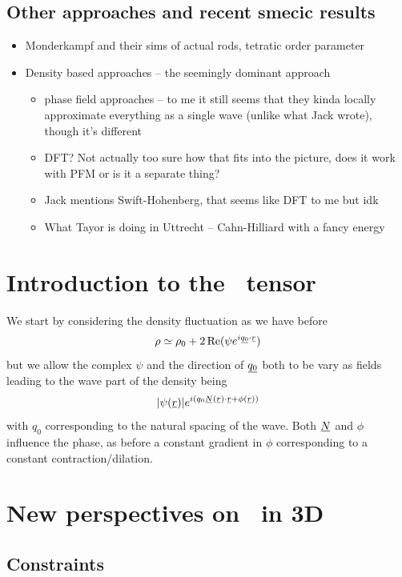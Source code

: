 \documentclass[12pt]{article}
\newcommand{\suf}[2]{\stackunder[1pt]{\ensuremath{#1}}{\rule{\widthof{\ensuremath{#2}}*\real{0.9}}{.1ex}}}
\newcommand{\duf}[2]{\stackunder[1pt]{\suf{\ensuremath{#1}}{#2}}{\rule{\widthof{\ensuremath{#2}}*\real{0.9}}{.1ex}}}
\newcommand{\su}[1]{\suf{#1}{#1}}
\newcommand{\du}[1]{\duf{#1}{#1}}
\newcommand{\ssu}[1]{\scriptsize\su{#1}\normalsize}
\newcommand{\EE}{\du{E}}
\begin{document}
\subsection{Other approaches and recent smecic results}
\begin{itemize}
    \item Monderkampf and their sims of actual rods, tetratic order parameter
    \item Density based approaches -- the seemingly dominant approach
    \begin{itemize}
        \item phase field approaches -- to me it still seems that they kinda locally approximate everything as a single wave (unlike what Jack wrote), though it's different
        \item DFT? Not actually too sure how that fits into the picture, does it work with PFM or is it a separate thing?
        \item Jack mentions Swift-Hohenberg, that seems like DFT to me but idk
        \item What Tayor is doing in Uttrecht -- Cahn-Hilliard with a fancy energy
    \end{itemize}
\end{itemize}

\section{Introduction to the \EE\ tensor}
We start by considering the density fluctuation as we have before
\begin{equation}
    \rho \simeq \rho_0 + 2\Re(\psi e^{i \ssu{q_0} \cdot \ssu{r}})
\end{equation}
but we allow the complex $\psi$ and the direction of $\su{q_0}$ both to be vary as fields leading to the wave part of the density being
\begin{equation}
    |\psi(\su{r})|e^{i (q_0 \ssu{N}(\ssu{r}) \cdot \ssu{r} + \phi(\ssu{r}))}
\end{equation}
with $q_0$ corresponding to the natural spacing of the wave.
Both $\su{N}$ and $\phi$ influence the phase, as before a constant gradient in $\phi$ corresponding to a constant contraction/dilation.


\section{New perspectives on \EE\ in 3D}
\subsection{Constraints}
\end{document}
